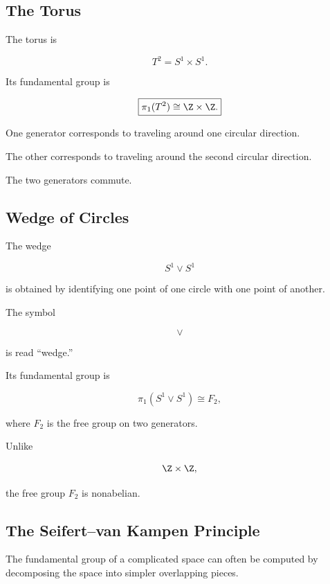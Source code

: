 \subsection{The Torus}
\label{subsec:fundamental-group-torus}

The torus is

\[
\boxed{
T^2=S^1\times S^1.
}
\]

Its fundamental group is

\[
\boxed{
\pi_1(T^2)
\cong
\Z\times\Z.
}
\]

One generator corresponds to traveling around one circular direction.

The other corresponds to traveling around the second circular direction.

The two generators commute.

\subsection{Wedge of Circles}
\label{subsec:wedge-of-circles}

The wedge

\[
S^1\vee S^1
\]

is obtained by identifying one point of one circle with one point of another.

The symbol

\[
\vee
\]

is read ``wedge.''

Its fundamental group is

\[
\boxed{
\pi_1(S^1\vee S^1)
\cong
F_2,
}
\]

where \(F_2\) is the free group on two generators.

Unlike

\[
\Z\times\Z,
\]

the free group \(F_2\) is nonabelian.

\subsection{The Seifert--van Kampen Principle}
\label{subsec:seifert-van-kampen}

The fundamental group of a complicated space can often be computed by
decomposing the space into simpler overlapping pieces.

